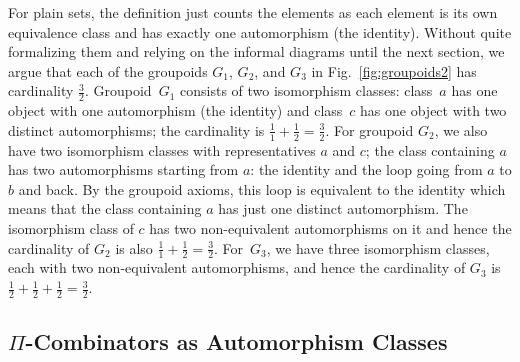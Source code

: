 For plain sets, the definition just counts the elements as each element is its
own equivalence class and has exactly one automorphism (the identity). Without
quite formalizing them and relying on the informal diagrams until the next
section, we argue that each of the groupoids $G_1$, $G_2$, and $G_3$ in
Fig.~\ref{fig:groupoids2} has cardinality $\frac{3}{2}$. Groupoid~$G_1$ consists
of two isomorphism classes: class~$a$ has one object with one automorphism (the
identity) and class~$c$ has one object with two distinct automorphisms; the
cardinality is $\frac{1}{1} + \frac{1}{2} = \frac{3}{2}$. For groupoid $G_2$, we
also have two isomorphism classes with representatives $a$ and $c$; the class
containing $a$ has two automorphisms starting from $a$: the identity and the
loop going from $a$ to $b$ and back. By the groupoid axioms, this loop is
equivalent to the identity which means that the class containing $a$ has just
one distinct automorphism. The isomorphism class of $c$ has two non-equivalent
automorphisms on it and hence the cardinality of $G_2$ is also
$\frac{1}{1} + \frac{1}{2} = \frac{3}{2}$. For~$G_3$, we have three isomorphism
classes, each with two non-equivalent automorphisms, and hence the cardinality
of $G_3$ is $\frac{1}{2} + \frac{1}{2} + \frac{1}{2} = \frac{3}{2}$.

\subsection{$\Pi$-Combinators as Automorphism Classes}

